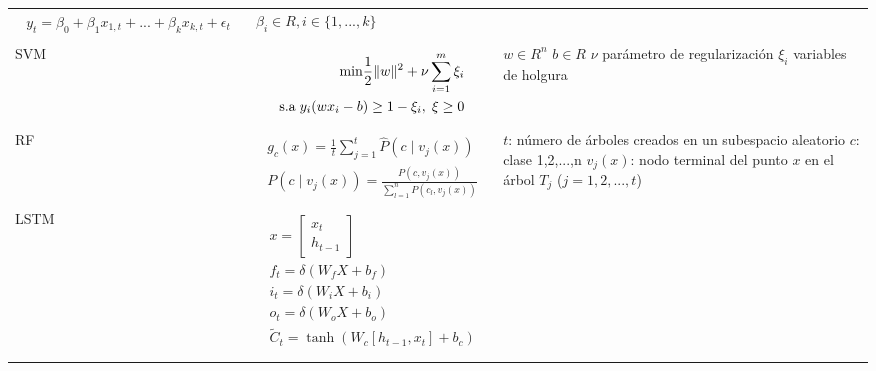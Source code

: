 \begin{table}
\begin{adjustbox}{width=0.95\textwidth}
\begin{tabular} {m{2cm} m{9cm} m{7cm}}
\begin{align}
			\label{eqn:5}
			\begin{split}
				y_{t} = \beta_{0}+\beta_{1}x_{1,t}+...+\beta_{k}x_{k,t}+\epsilon_{t}
			\end{split}
		\end{align}
		&
		$\beta_i\in R, i\in\{1,...,k\}$\newline
		\\
		SVM 		&	
		\begin{align}
			\label{eqn:6}
			\begin{split}
				\textrm{min} \frac{1}{2}\|w\|^{2}+\nu\sum_{i=1}^{m}\xi_{i}\\
				\textrm{s.a}\hspace{0.1cm} y_{i}(wx_{i}-b)\geq  1-\xi_{i},\hspace{0.1cm} \xi\geq 0
			\end{split}
		\end{align}
		&
		$w\in R^{n}$\newline
		$b\in R$\newline 
		$\nu$ parámetro de regularización \newline
		$\xi_{i}$ variables de holgura
		\\
		RF 		&	
		\begin{align}
			\label{eqn:8}
			\begin{split}
				g_{c}(x)=\frac{1}{t}\sum_{j=1}^{t}\hat{P}(c\mid v_{j}(x))\\
				P(c\mid v_{j}(x)) = \frac{P(c, v_{j}(x))}{\sum_{l=1}^{n}P(c_{l},v_{j}(x))}	
			\end{split}
		\end{align}
		&
		$t$: número de árboles creados en un subespacio aleatorio\newline
		$c$: clase 1,2,...,n\newline
		$v_{j}(x)$: nodo terminal del punto $x$ en el árbol $T_{j}$ ($j = 1,2,...,t$)
		\\
		LSTM 	&	
		\begin{align}
			\label{eqn:7}
			\begin{split}
				x = \left[ \begin{array}{c} x_{t} \\ h_{t-1} \end{array} \right]\\
				f_{t} = \delta(W_{f}X+b_{f})\\
				i_{t} = \delta(W_{i}X+b_{i})\\
				o_{t} = \delta(W_{o}X+b_{o})\\
				\tilde{C}_{t} = \tanh (W_{c}[h_{t-1},x_{t}]+b_{c})\\

\end{split}
\end{align}
\end{tabular}
\end{adjustbox}
\end{table}
